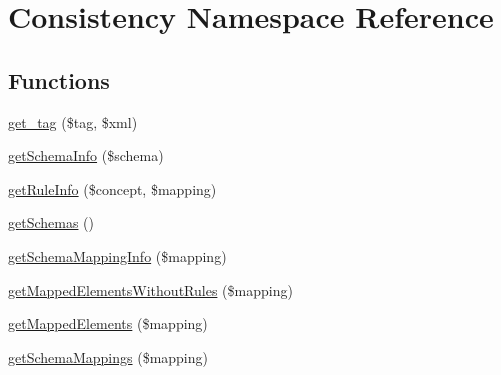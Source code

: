\hypertarget{namespace_consistency}{}\section{Consistency Namespace Reference}
\label{namespace_consistency}
\subsection*{Functions}
\begin{DoxyCompactItemize}
\item 
\hyperlink{namespace_consistency_ab1a6caf75ca08c5daec473d54c0416da}{get\+\_\+tag} (\$tag, \$xml)
\item 
\hyperlink{namespace_consistency_a4359f5b054e4c15acb39a611e29e17c8}{get\+Schema\+Info} (\$schema)
\item 
\hyperlink{namespace_consistency_a1e0e4ba06ca24d6cd0bda99a99ce9f5d}{get\+Rule\+Info} (\$concept, \$mapping)
\item 
\hyperlink{namespace_consistency_ac3ce77dc252c4606ec6b0378f5d79ac7}{get\+Schemas} ()
\item 
\hyperlink{namespace_consistency_a9bf0ee2da6d3a74ee9dbfcf73ae9842e}{get\+Schema\+Mapping\+Info} (\$mapping)
\item 
\hyperlink{namespace_consistency_a2be2339d3806b3febbdb87bd1c27e603}{get\+Mapped\+Elements\+Without\+Rules} (\$mapping)
\item 
\hyperlink{namespace_consistency_a489e7863dc1879d02c46deb03793bc03}{get\+Mapped\+Elements} (\$mapping)
\item 
\hyperlink{namespace_consistency_aa98f8a888d842fcaefeca3407c10435c}{get\+Schema\+Mappings} (\$mapping)
\end{DoxyCompactItemize}
